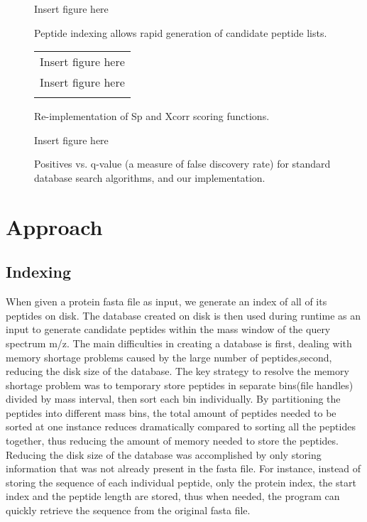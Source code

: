 \documentclass{bioinfo}
\begin{document}


\begin{figure}
  \centering
  Insert figure here
  \caption{Peptide indexing allows rapid generation of candidate peptide
  lists.}
  \label{figure:indexing}
\end{figure}

\begin{figure}
  \centering
  \begin{tabular}{c}
  Insert figure here \\
  Insert figure here \\
  \caption{Re-implementation of Sp and Xcorr scoring functions.}
  \label{figure:indexing}
  \end{tabular}
\end{figure}

\begin{figure}
  \centering
  Insert figure here
  \caption{Positives vs. q-value (a measure of false discovery rate) for
  standard database search algorithms, and our implementation.}
  \label{figure:indexing}
\end{figure}



\section{Approach}

\subsection*{Indexing}
When given a protein fasta file as input, we generate an index of all
of its peptides on disk. The database created on disk is then used
during runtime as an input to generate candidate peptides within the
mass window of the query spectrum m/z. The main difficulties in
creating a database is first, dealing with memory shortage problems
caused by the large number of peptides,second, reducing the disk size
of the database. The key strategy to resolve the memory shortage
problem was to temporary store peptides in separate bins(file handles)
divided by mass interval, then sort each bin individually. By
partitioning the peptides into different mass bins, the total amount
of peptides needed to be sorted at one instance reduces dramatically
compared to sorting all the peptides together, thus reducing the
amount of memory needed to store the peptides. Reducing the disk size
of the database was accomplished by only storing information that was
not already present in the fasta file. For instance, instead of
storing the sequence of each individual peptide, only the protein
index, the start index and the peptide length are stored, thus when
needed, the program can quickly retrieve the sequence from the
original fasta file.
\end{document}
